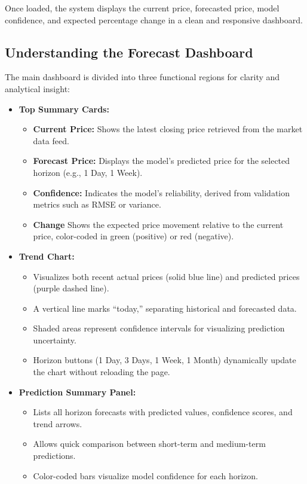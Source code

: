 Once loaded, the system displays the current price, forecasted price, model confidence, and expected percentage change in a clean and responsive dashboard.

\subsection{Understanding the Forecast Dashboard}

The main dashboard is divided into three functional regions for clarity and analytical insight:

\begin{itemize}
  \item \textbf{Top Summary Cards:}
    \begin{itemize}
      \item \textbf{Current Price:} Shows the latest closing price retrieved from the market data feed.
      \item \textbf{Forecast Price:} Displays the model’s predicted price for the selected horizon (e.g., 1 Day, 1 Week).
      \item \textbf{Confidence:} Indicates the model’s reliability, derived from validation metrics such as RMSE or variance.
      \item \textbf{Change} Shows the expected price movement relative to the current price, color-coded in green (positive) or red (negative).
    \end{itemize}
  \item \textbf{Trend Chart:}
    \begin{itemize}
      \item Visualizes both recent actual prices (solid blue line) and predicted prices (purple dashed line).
      \item A vertical line marks “today,” separating historical and forecasted data.
      \item Shaded areas represent confidence intervals for visualizing prediction uncertainty.
      \item Horizon buttons (1 Day, 3 Days, 1 Week, 1 Month) dynamically update the chart without reloading the page.
    \end{itemize}
  \item \textbf{Prediction Summary Panel:}
    \begin{itemize}
      \item Lists all horizon forecasts with predicted values, confidence scores, and trend arrows.
      \item Allows quick comparison between short-term and medium-term predictions.
      \item Color-coded bars visualize model confidence for each horizon.
    \end{itemize}
\end{itemize}

